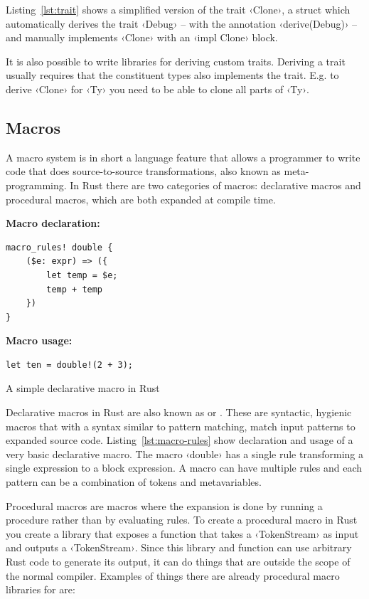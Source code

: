 Listing~\ref{lst:trait} shows a simplified version of the trait ‹Clone›, a struct which automatically derives the trait ‹Debug› -- with the annotation ‹derive(Debug)› -- and manually implements ‹Clone› with an ‹impl Clone› block.

It is also possible to write libraries for deriving custom traits. Deriving a trait usually requires that the constituent types also implements the trait. E.g. to derive ‹Clone› for ‹Ty› you need to be able to clone all parts of ‹Ty›.

\subsection{Macros}
\label{sec:macros}

A macro system is in short a language feature that allows a programmer to write code that does source-to-source transformations, also known as meta-programming. In Rust there are two categories of macros: declarative macros and procedural macros, which are both expanded at compile time.

\begin{listing}[ht!]
\textbf{Macro declaration:}
\begin{verbatim}
macro_rules! double {
    ($e: expr) => ({
        let temp = $e;
        temp + temp
    })
}
\end{verbatim}
\vspace{5mm}

\textbf{Macro usage:}
\begin{verbatim}
let ten = double!(2 + 3);
\end{verbatim}
\caption{A simple declarative macro in Rust}
\label{lst:macro-rules}
\end{listing}

Declarative macros in Rust are also known as  or . These are syntactic, hygienic macros that with a syntax similar to pattern matching, match input patterns to expanded source code. Listing~\ref{lst:macro-rules} show declaration and usage of a very basic declarative macro. The macro ‹double› has a single rule transforming a single expression to a block expression. A macro can have multiple rules and each pattern can be a combination of tokens and metavariables.

Procedural macros are macros where the expansion is done by running a procedure rather than by evaluating rules. To create a procedural macro in Rust you create a library that exposes a function that takes a ‹TokenStream› as input and outputs a ‹TokenStream›. Since this library and function can use arbitrary Rust code to generate its output, it can do things that are outside the scope of the normal compiler. Examples of things there are already procedural macro libraries for are:


